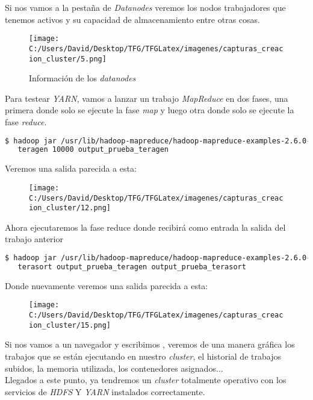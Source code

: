 Si nos vamos a la pestaña de \textit{Datanodes} veremos los nodos trabajadores que tenemos activos y su 
capacidad de almacenamiento entre otras cosas.

\begin{figure}[!htpb]
  \centering
  \texttt{[image: C:/Users/David/Desktop/TFG/TFGLatex/imagenes/capturas\_creacion\_cluster/5.png]}
  \caption[Información web \textit{Datanode}]{Información de los \textit{datanodes}}
\end{figure}

\clearpage

Para testear \textit{YARN}, vamos a lanzar un trabajo \textit{MapReduce} en dos fases, una primera donde
solo se ejecute la fase \textit{map} y luego otra donde solo se ejecute la fase \textit{reduce}.

\begin{lstlisting}[language=bash, numbers=none]
$ hadoop jar /usr/lib/hadoop-mapreduce/hadoop-mapreduce-examples-2.6.0-cdh5.9.0.jar \
   teragen 10000 output_prueba_teragen
\end{lstlisting}

Veremos una salida parecida a esta:

\begin{figure}[!htpb]
  \centering
  \texttt{[image: C:/Users/David/Desktop/TFG/TFGLatex/imagenes/capturas\_creacion\_cluster/12.png]}
\end{figure}

Ahora ejecutaremos la fase reduce donde recibirá como entrada la salida del trabajo anterior

\begin{lstlisting}[language=bash, numbers=none]
$ hadoop jar /usr/lib/hadoop-mapreduce/hadoop-mapreduce-examples-2.6.0-cdh5.9.0.jar \
   terasort output_prueba_teragen output_prueba_terasort
\end{lstlisting}

Donde nuevamente veremos una salida parecida a esta:

\begin{figure}[!htpb]
  \centering
  \texttt{[image: C:/Users/David/Desktop/TFG/TFGLatex/imagenes/capturas\_creacion\_cluster/15.png]}
\end{figure}

Si nos vamos a un navegador y escribimos , veremos de una manera gráfica
los trabajos que se están ejecutando en nuestro \textit{cluster}, el historial de trabajos subidos, la
memoria utilizada, los contenedores asignados...\\
Llegados a este punto, ya tendremos un \textit{cluster} totalmente operativo con los servicios de
\textit{HDFS} Y \textit{YARN} instalados correctamente.

